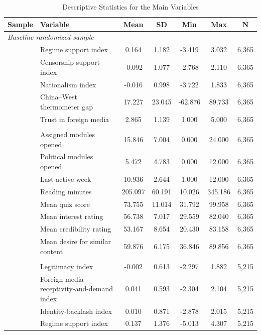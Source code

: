 \begin{table}[H]
\centering
\begin{threeparttable}
\caption{Descriptive Statistics for the Main Variables}
\label{tab:main_variable_descriptives}
\scriptsize
\setlength{\tabcolsep}{4pt}
\begin{tabular}{llccccc}
\toprule
Sample & Variable & Mean & SD & Min & Max & N \\
\midrule
\multicolumn{7}{l}{\textit{Baseline randomized sample}} \\
& Regime support index & 0.164 & 1.182 & -3.419 & 3.032 & 6,365 \\
& Censorship support index & -0.092 & 1.077 & -2.768 & 2.110 & 6,365 \\
& Nationalism index & -0.016 & 0.998 & -3.722 & 1.833 & 6,365 \\
& China--West thermometer gap & 17.227 & 23.045 & -62.876 & 89.733 & 6,365 \\
& Trust in foreign media & 2.865 & 1.139 & 1.000 & 5.000 & 6,365 \\
\addlinespace
\multicolumn{7}{l}{\textit{Weekly participant aggregates}} \\
& Assigned modules opened & 15.846 & 7.004 & 0.000 & 24.000 & 6,365 \\
& Political modules opened & 5.472 & 4.783 & 0.000 & 12.000 & 6,365 \\
& Last active week & 10.936 & 2.644 & 1.000 & 12.000 & 6,365 \\
& Reading minutes & 205.097 & 60.191 & 10.026 & 345.186 & 6,365 \\
& Mean quiz score & 73.755 & 11.014 & 31.792 & 99.958 & 6,365 \\
& Mean interest rating & 56.738 & 7.017 & 29.559 & 82.040 & 6,365 \\
& Mean credibility rating & 53.167 & 8.654 & 20.430 & 83.158 & 6,365 \\
& Mean desire for similar content & 59.876 & 6.175 & 36.846 & 89.856 & 6,365 \\
\addlinespace
\multicolumn{7}{l}{\textit{Endline respondents}} \\
& Legitimacy index & -0.002 & 0.613 & -2.297 & 1.882 & 5,215 \\
& Foreign-media receptivity-and-demand index & 0.041 & 0.593 & -2.304 & 2.104 & 5,215 \\
& Identity-backlash index & 0.010 & 0.871 & -2.878 & 2.015 & 5,215 \\
& Regime support index & 0.137 & 1.376 & -5.013 & 4.307 & 5,215 \\

\end{tabular}
\end{threeparttable}
\end{table}

